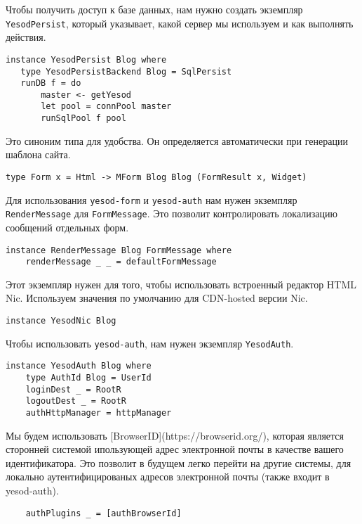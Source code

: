 Чтобы получить доступ к базе данных, нам нужно создать экземпляр \lstinline!YesodPersist!, который указывает, какой сервер мы используем и как выполнять действия. 
 
\begin{lstlisting}
instance YesodPersist Blog where
   type YesodPersistBackend Blog = SqlPersist
   runDB f = do 
       master <- getYesod
       let pool = connPool master
       runSqlPool f pool
\end{lstlisting}
 
Это синоним типа для удобства. Он определяется автоматически при генерации шаблона сайта. 
 
\begin{lstlisting}
type Form x = Html -> MForm Blog Blog (FormResult x, Widget)
\end{lstlisting}
 
Для использования \lstinline!yesod-form! и \lstinline!yesod-auth! нам нужен экземпляр \lstinline!RenderMessage! для \lstinline!FormMessage!. Это позволит контролировать локализацию сообщений отдельных форм. 
 
\begin{lstlisting}
instance RenderMessage Blog FormMessage where
    renderMessage _ _ = defaultFormMessage
\end{lstlisting}
 
Этот экземпляр нужен для того, чтобы использовать встроенный редактор HTML Nic. Используем значения по умолчанию для CDN-hosted версии Nic. 
 
\begin{lstlisting}
instance YesodNic Blog
\end{lstlisting}
 
Чтобы использовать \lstinline!yesod-auth!, нам нужен экземпляр \lstinline!YesodAuth!. 
 
\begin{lstlisting}
instance YesodAuth Blog where
    type AuthId Blog = UserId
    loginDest _ = RootR
    logoutDest _ = RootR
    authHttpManager = httpManager
\end{lstlisting}
 
Мы будем использовать [BrowserID](https://browserid.org/), которая является сторонней системой ипользующей адрес электронной почты в качестве вашего идентификатора. Это позволит в будущем легко перейти на другие системы, для локально аутентифицированых адресов электронной почты (также входит в yesod-auth). 
 
\begin{lstlisting}
    authPlugins _ = [authBrowserId]
\end{lstlisting}
 
